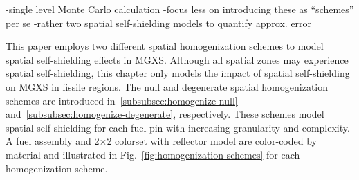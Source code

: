 -single level Monte Carlo calculation
-focus less on introducing these as ``schemes'' per se
  -rather two spatial self-shielding models to quantify approx. error

This paper employs two different spatial homogenization schemes to model spatial self-shielding effects in MGXS. Although all spatial zones may experience spatial self-shielding, this chapter only models the impact of spatial self-shielding on MGXS in fissile regions. The null and degenerate spatial homogenization schemes are introduced in~\autoref{subsubsec:homogenize-null} and~\autoref{subsubsec:homogenize-degenerate}, respectively. These schemes model spatial self-shielding for each fuel pin with increasing granularity and complexity. A fuel assembly and 2$\times$2 colorset with reflector model are color-coded by material and illustrated in Fig.~\ref{fig:homogenization-schemes} for each homogenization scheme.

